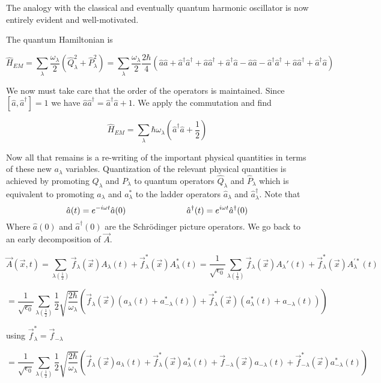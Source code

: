 \documentclass[12pt]{article}
\begin{document}
The analogy with the classical and eventually quantum harmonic oscillator is now entirely evident and well-motivated.

The quantum Hamiltonian is 

\[\hat{H}_{EM} = \sum_{\lambda} \frac{\omega_{\lambda}}{2} (\hat{Q}_{\lambda}^2 + \hat{P}_{\lambda}^2 ) = \sum_{\lambda} \frac{\omega_{\lambda}}{2} \frac{2\hbar}{4} (\hat{a}\hat{a} +\hat{a}^{\dag} \hat{a}^{\dag} + \hat{a} \hat{a}^{\dag} + \hat{a}^{\dag} \hat{a} - \hat{a}\hat{a} - \hat{a}^{\dag} \hat{a}^{\dag} + \hat{a} \hat{a}^{\dag} + \hat{a}^{\dag} \hat{a} )\]

We now must take care that the order of the operators is maintained. Since $[\hat{a},\hat{a}^{\dag}]=1$ we have $\hat{a}\hat{a}^{\dag} = \hat{a}^{\dag} \hat{a} + 1$. We apply the commutation and find

\[\hat{H}_{EM} = \sum_{\lambda} \hbar \omega_{\lambda} \left(\hat{a}^{\dag} \hat{a} + \frac{1}{2}\right) \]


Now all that remains is a re-writing of the important physical quantities in terms of these new $a_{\lambda}$ variables. Quantization of the relevant physical quantities is achieved by promoting $Q_{\lambda}$ and $P_{\lambda}$ to quantum operators $\hat{Q}_{\lambda}$ and $\hat{P}_{\lambda}$ which is equivalent to promoting $a_{\lambda}$ and $a_{\lambda}^*$ to the ladder operators $\hat{a}_{\lambda}$ and $\hat{a}_{\lambda}^{\dag}$.
Note that
\[\hat{a}(t) = e^{-i \omega t} \hat{a}(0) \hspace{1 in} 
\hat{a}^{\dag}(t) = e^{i\omega t} \hat{a}^{\dag}(0)\]
Where $\hat{a}(0)$ and $\hat{a}^{\dag}(0)$ are the Schr{\"o}dinger picture operators.
We go back to an early decomposition of $\vec{A}$.

\[ \vec{A}(\vec{x},t) = \sum_{\lambda \left(\frac{1}{2}\right)} \vec{f}_{\lambda}(\vec{x}) A_{\lambda}(t) + \vec{f}_{\lambda}^*(\vec{x}) A_{\lambda}^*(t)
 = \frac{1}{\sqrt{\epsilon_0}} \sum_{\lambda \left(\frac{1}{2}\right)} \vec{f}_{\lambda}(\vec{x}) A_{\lambda}'(t) + \vec{f}_{\lambda}^*(\vec{x}) A_{\lambda}^{'*}(t)\]
 
\[ = \frac{1}{\sqrt{\epsilon_0}} \sum_{\lambda \left(\frac{1}{2} \right)} \frac{1}{2} \sqrt{\frac{2 \hbar}{\omega_{\lambda}}} \left(\vec{f}_{\lambda}(\vec{x}) (a_{\lambda}(t)+a_{-\lambda}^*(t))+\vec{f}_{\lambda}^*(\vec{x})(a_{\lambda}^*(t)+a_{-\lambda}(t))\right) \]

using $\vec{f}_{\lambda}^*=\vec{f}_{-\lambda}$

\[ = \frac{1}{\sqrt{\epsilon_0}} \sum_{\lambda \left(\frac{1}{2} \right)} \frac{1}{2} \sqrt{\frac{2 \hbar}{\omega_{\lambda}}} \left(\vec{f}_{\lambda}(\vec{x}) a_{\lambda}(t) + \vec{f}_{\lambda}^*(\vec{x}) a_{\lambda}^*(t) + \vec{f}_{-\lambda}(\vec{x}) a_{-\lambda}(t) +\vec{f}_{-\lambda}^*(\vec{x}) a_{-\lambda}^*(t)    \right)  \]
\end{document}
